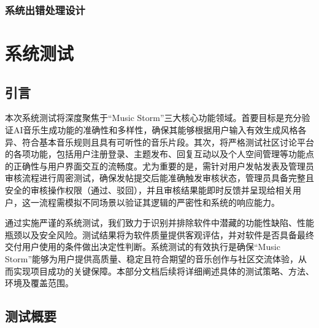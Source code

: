 \documentclass{base}
\numberwithin{figure}{section} %
\begin{document}
\subsubsection{系统出错处理设计}


\newpage

\section{系统测试}

\subsection{引言}

本次系统测试将深度聚焦于“Music Storm”三大核心功能领域。首要目标是充分验证AI音乐生成功能的准确性和多样性，确保其能够根据用户输入有效生成风格各异、符合基本音乐规则且具有可听性的音乐片段。其次，将严格测试社区讨论平台的各项功能，包括用户注册登录、主题发布、回复互动以及个人空间管理等功能点的正确性与用户界面交互的流畅度。尤为重要的是，需针对用户发帖发表及管理员审核流程进行周密测试，确保发帖提交后能准确触发审核状态，管理员具备完整且安全的审核操作权限（通过、驳回），并且审核结果能即时反馈并呈现给相关用户，这一流程需模拟不同场景以验证其逻辑的严密性和系统的响应能力。

通过实施严谨的系统测试，我们致力于识别并排除软件中潜藏的功能性缺陷、性能瓶颈以及安全风险。测试结果将为软件质量提供客观评估，并对软件是否具备最终交付用户使用的条件做出决定性判断。系统测试的有效执行是确保“Music Storm”能够为用户提供高质量、稳定且符合期望的音乐创作与社区交流体验，从而实现项目成功的关键保障。本部分文档后续将详细阐述具体的测试策略、方法、环境及覆盖范围。

\subsection{测试概要}
\end{document}
